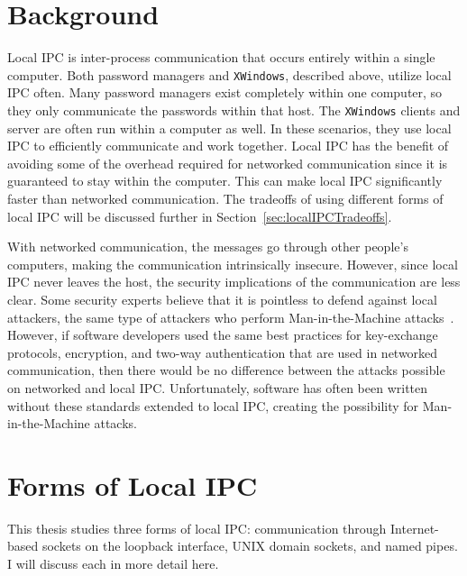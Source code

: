 \section{Background}
\label{sec:localIPCBackground}
Local IPC is inter-process communication that occurs entirely within a single computer.  Both password managers and \texttt{XWindows}, described above, utilize local IPC often.  Many password managers exist completely within one computer, so they only communicate the passwords within that host.  The \texttt{XWindows} clients and server are often run within a computer as well.  In these scenarios, they use local IPC to efficiently communicate and work together.  Local IPC has the benefit of avoiding some of the overhead required for networked communication since it is guaranteed to stay within the computer.  This can make local IPC significantly faster than networked communication.  The tradeoffs of using different forms of local IPC will be discussed further in Section~\ref{sec:localIPCTradeoffs}.

With networked communication, the messages go through other people's computers, making the communication intrinsically insecure.  However, since local IPC never leaves the host, the security implications of the communication are less clear.  Some security experts believe that it is pointless to defend against local attackers, the same type of attackers who perform Man-in-the-Machine attacks~\cite{MitMa}.  However, if software developers used the same best practices for key-exchange protocols, encryption, and two-way authentication that are used in networked communication, then there would be no difference between the attacks possible on networked and local IPC.  Unfortunately, software has often been written without these standards extended to local IPC, creating the possibility for Man-in-the-Machine attacks.

\section{Forms of Local IPC}
\label{sec:formsOfLocalIPC}
This thesis studies three forms of local IPC: communication through Internet-based sockets on the loopback interface, UNIX domain sockets, and named pipes.  I will discuss each in more detail here.

